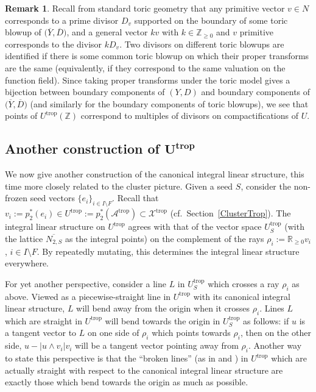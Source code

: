 \documentclass[pdftex]{sigma}
\numberwithin{equation}{section}
\numberwithin{figure}{section}
\numberwithin{table}{section}
\DeclareMathOperator{\trop}{trop}
\let\?=\overline
\let\bb=\mathbb
\let\s=\mathcal
\theoremstyle{definition}
\newtheorem{rmk}[thm]{Remark}
\begin{document}
\begin{rmk}\label{divisorial} Recall from standard toric geometry that any primitive vector $v\in N$ corresponds to a prime divisor $D_v$ supported on the boundary of some toric blowup of $\big(\?{Y},\?{D}\big)$, and a general vector $kv$ with $k\in \bb{Z}_{\geq 0}$ and $v$ primitive corresponds to the divisor $kD_{v}$. Two divisors on different toric blowups are identified if there is some common toric blowup on which their proper transforms are the same (equivalently, if they correspond to the same valuation on the function field). Since taking proper transforms under the toric model gives a bijection between boundary components of $(Y,D)$ and boundary components of $\big(\?{Y},\?{D}\big)$ (and similarly for the boundary components of toric blowups), we see that points of $U^{\trop}(\bb{Z})$ correspond to multiples of divisors on compactifications of $U$.
\end{rmk}

\subsection[Another construction of $U^{\trop}$]{Another construction of $\boldsymbol{U^{\trop}}$}\label{SeedScatter}
We now give another construction of the canonical integral linear structure, this time more closely related to the cluster picture. Given a seed $S$, consider the non-frozen seed vectors $\{e_i\}_{i\in I\setminus F}$. Recall that $v_i:=p_2^*(e_i) \in U^{\trop}:=p_2^*(\s{A}^{\trop})\subset \s{X}^{\trop}$ (cf.\ Section~\ref{ClusterTrop}). The integral linear structure on $U^{\trop}$ agrees with that of the vector space $U^{\trop}_S$ (with the lattice $\?{N_{2,S}}$ as the integral points) on the complement of the rays $\rho_i:=\bb{R}_{\geq 0} v_i$, $i\in I\setminus F$. By repeatedly mutating, this determines the integral linear structure everywhere.

For yet another perspective, consider a line $L$ in $U^{\trop}_S$ which crosses a ray $\rho_i$ as above. Viewed as a piecewise-straight line in $U^{\trop}$ with its canonical integral linear structure, $L$ will bend away from the origin when it crosses $\rho_i$. Lines $L$ which are straight in $U^{\trop}$ will bend towards the origin in $U^{\trop}_S$ as follows: if $u$ is a tangent vector to $L$ on one side of $\rho_i$ which points towards $\rho_i$, then on the other side, $u-|u\wedge v_i| v_i$ will be a tangent vector pointing away from $\rho_i$.
 Another way to state this perspective is that the ``broken lines'' (as in \cite{GHK1} and \cite{GHKK}) in $U^{\trop}$ which are actually straight with respect to the canonical integral linear structure are exactly those which bend towards the origin as much as possible.
\end{document}
